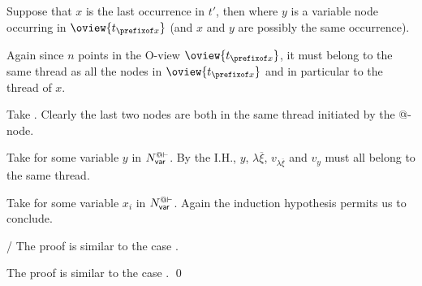 \begin{compactitem}
\begin{compactitem}
        \item Suppose that $x$ is the last occurrence in $t'$, then
         where $y$ is a variable node occurring in $\oview{t_{\prefixof x}}$ (and $x$ and $y$ are possibly the same occurrence).

            Again since $n$ points in the O-view $\oview{t_{\prefixof x}}$, it must belong to the same thread
            as all the nodes in $\oview{t_{\prefixof x}}$ and in particular to the thread of $x$.
        \end{compactitem}

    \item[\rulenamet{Value$^{\lambda\mapsto@}$}]
      Take . Clearly the last two nodes are
    both in the same thread initiated by the @-node.

     \item[\rulenamet{Value$^{\lambda\mapsto{\sf var}}$}] Take  for some variable $y$ in $N_{\sf var}^{@\vdash}$. By the I.H., $y$, $\lambda \overline{\xi}$, $v_{\lambda \overline{\xi}}$ and $v_y$ must all belong to the same thread.

    \item[\rulenamet{Var}]
    Take  for some
        variable $x_i$ in $N_{\sf var}^{@\vdash}$.
        Again the induction hypothesis permits us to conclude.

    \item[\rulenamet{$\Sigma$}/\rulenamet{$\Sigma$-var}]
    The proof is similar to the case .
    \item[\rulenamet{$\Sigma$-Value}]
    The proof is similar to the case
    .
    \qed
\end{compactitem}
\bigskip

